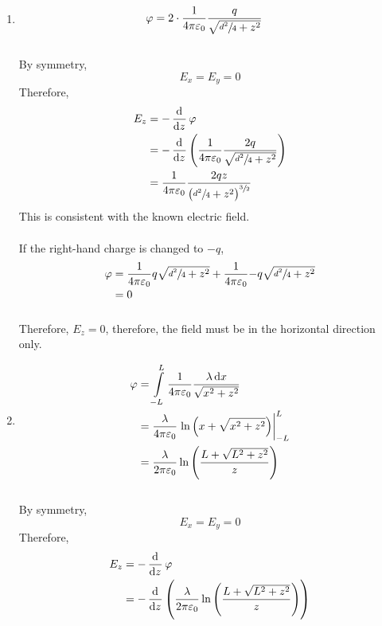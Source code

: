 \documentclass[fleqn, a4paper, 12pt, oneside]{amsart}
\theoremstyle{definition}
\theoremstyle{theorem}
\begin{document}
\begin{solution}
	\begin{enumerate}
		\item
			\begin{align*}
				\varphi &= 2 \cdot \dfrac{1}{4 \pi \varepsilon_0} \dfrac{q}{\sqrt{\sfrac{d^2}{4} + z^2}}
			\end{align*}
			~\\
			By symmetry,
			\begin{equation*}
				E_x = E_y = 0
			\end{equation*}
			Therefore,
			\begin{align*}
				E_z &= -\dod{}{z} \varphi\\
				&= -\dod{}{z} \left( \dfrac{1}{4 \pi \varepsilon_0} \dfrac{2q}{\sqrt{\sfrac{d^2}{4} + z^2}} \right)\\
				&= \dfrac{1}{4 \pi \varepsilon_0} \dfrac{2q z}{\left( \sfrac{d^2}{4} + z^2 \right)^{\sfrac{3}{2}}}
			\end{align*}
			This is consistent with the known electric field.\\
			~\\
			If the right-hand charge is changed to $-q$,
			\begin{align*}
				\varphi &= \dfrac{1}{4 \pi \varepsilon_0}{q}{\sqrt{\sfrac{d^2}{4} + z^2}} + \dfrac{1}{4 \pi \varepsilon_0}{-q}{\sqrt{\sfrac{d^2}{4} + z^2}}\\
				&= 0
			\end{align*}\\
			Therefore, $E_z = 0$, therefore, the field must be in the horizontal direction only.
		\item
			\begin{align*}
				\varphi &= \int\limits_{-L}^{L} \dfrac{1}{4 \pi \varepsilon_0} \dfrac{\lambda \dif x}{\sqrt{x^2 + z^2}}\\
				&= \dfrac{\lambda}{4 \pi \varepsilon_0} \left. \ln \left( x + \sqrt{x^2 + z^2} \right) \right|_{-L}^{L}\\
				&= \dfrac{\lambda}{2 \pi \varepsilon_0} \ln \left( \dfrac{L + \sqrt{L^2 + z^2}}{z} \right)
			\end{align*}
			~\\
			By symmetry,
			\begin{equation*}
				E_x = E_y = 0
			\end{equation*}
			Therefore,
			\begin{align*}
				E_z &= -\dod{}{z} \varphi\\
				&= -\dod{}{z} \left( \dfrac{\lambda}{2 \pi \varepsilon_0} \ln \left( \dfrac{L + \sqrt{L^2 + z^2}}{z} \right) \right)\\

\end{align*}
\end{enumerate}
\end{solution}
\end{document}

